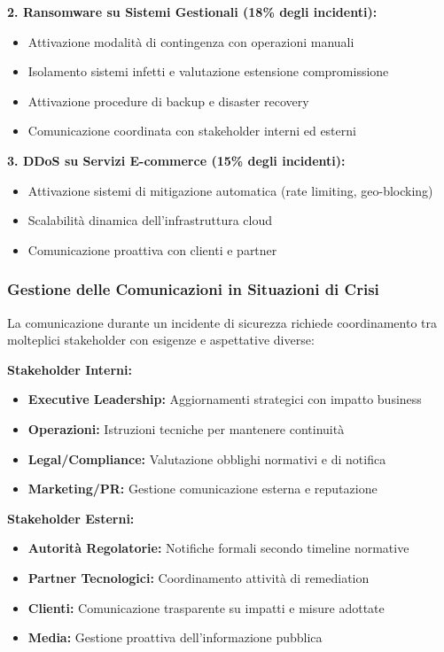\textbf{2. Ransomware su Sistemi Gestionali (18\% degli incidenti):}
\begin{itemize}
\item Attivazione modalità di contingenza con operazioni manuali
\item Isolamento sistemi infetti e valutazione estensione compromissione
\item Attivazione procedure di backup e disaster recovery
\item Comunicazione coordinata con stakeholder interni ed esterni
\end{itemize}

\textbf{3. DDoS su Servizi E-commerce (15\% degli incidenti):}
\begin{itemize}
\item Attivazione sistemi di mitigazione automatica (rate limiting, geo-blocking)
\item Scalabilità dinamica dell'infrastruttura cloud
\item Comunicazione proattiva con clienti e partner
\end{itemize}

\subsubsection{Gestione delle Comunicazioni in Situazioni di Crisi}

La comunicazione durante un incidente di sicurezza richiede coordinamento tra molteplici stakeholder con esigenze e aspettative diverse:

\textbf{Stakeholder Interni:}
\begin{itemize}
\item \textbf{Executive Leadership:} Aggiornamenti strategici con impatto business
\item \textbf{Operazioni:} Istruzioni tecniche per mantenere continuità
\item \textbf{Legal/Compliance:} Valutazione obblighi normativi e di notifica
\item \textbf{Marketing/PR:} Gestione comunicazione esterna e reputazione
\end{itemize}

\textbf{Stakeholder Esterni:}
\begin{itemize}
\item \textbf{Autorità Regolatorie:} Notifiche formali secondo timeline normative
\item \textbf{Partner Tecnologici:} Coordinamento attività di remediation
\item \textbf{Clienti:} Comunicazione trasparente su impatti e misure adottate
\item \textbf{Media:} Gestione proattiva dell'informazione pubblica
\end{itemize}

